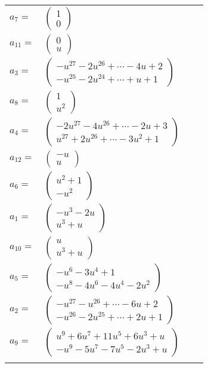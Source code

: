\documentclass[1p]{elsarticle_modified}
\theoremstyle{definition}
\begin{document}
\begin{tabular}{m{7pt} m{180pt} m{7pt} m{180pt} }
\flushright $a_{7}=$&$\begin{pmatrix}1\\0\end{pmatrix}$ \\
\flushright $a_{11}=$&$\begin{pmatrix}0\\u\end{pmatrix}$ \\
\flushright $a_{3}=$&$\begin{pmatrix}- u^{27}-2 u^{26}+\cdots-4 u+2\\- u^{25}-2 u^{24}+\cdots+u+1\end{pmatrix}$ \\
\flushright $a_{8}=$&$\begin{pmatrix}1\\u^2\end{pmatrix}$ \\
\flushright $a_{4}=$&$\begin{pmatrix}-2 u^{27}-4 u^{26}+\cdots-2 u+3\\u^{27}+2 u^{26}+\cdots-3 u^2+1\end{pmatrix}$ \\
\flushright $a_{12}=$&$\begin{pmatrix}- u\\u\end{pmatrix}$ \\
\flushright $a_{6}=$&$\begin{pmatrix}u^2+1\\- u^2\end{pmatrix}$ \\
\flushright $a_{1}=$&$\begin{pmatrix}- u^3-2 u\\u^3+u\end{pmatrix}$ \\
\flushright $a_{10}=$&$\begin{pmatrix}u\\u^3+u\end{pmatrix}$ \\
\flushright $a_{5}=$&$\begin{pmatrix}- u^6-3 u^4+1\\- u^8-4 u^6-4 u^4-2 u^2\end{pmatrix}$ \\
\flushright $a_{2}=$&$\begin{pmatrix}- u^{27}- u^{26}+\cdots-6 u+2\\- u^{26}-2 u^{25}+\cdots+2 u+1\end{pmatrix}$ \\
\flushright $a_{9}=$&$\begin{pmatrix}u^9+6 u^7+11 u^5+6 u^3+u\\- u^9-5 u^7-7 u^5-2 u^3+u\end{pmatrix}$\\&\end{tabular}
\end{document}

